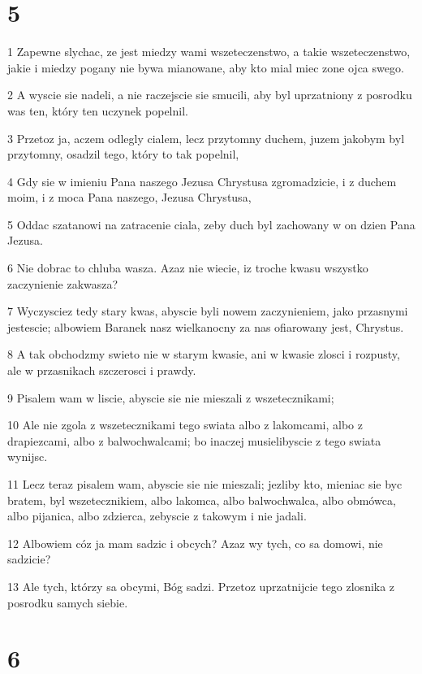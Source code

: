 \chapter{5}

\par 1 Zapewne slychac, ze jest miedzy wami wszeteczenstwo, a takie wszeteczenstwo, jakie i miedzy pogany nie bywa mianowane, aby kto mial miec zone ojca swego.
\par 2 A wyscie sie nadeli, a nie raczejscie sie smucili, aby byl uprzatniony z posrodku was ten, który ten uczynek popelnil.
\par 3 Przetoz ja, aczem odlegly cialem, lecz przytomny duchem, juzem jakobym byl przytomny, osadzil tego, który to tak popelnil,
\par 4 Gdy sie w imieniu Pana naszego Jezusa Chrystusa zgromadzicie, i z duchem moim, i z moca Pana naszego, Jezusa Chrystusa,
\par 5 Oddac szatanowi na zatracenie ciala, zeby duch byl zachowany w on dzien Pana Jezusa.
\par 6 Nie dobrac to chluba wasza. Azaz nie wiecie, iz troche kwasu wszystko zaczynienie zakwasza?
\par 7 Wyczysciez tedy stary kwas, abyscie byli nowem zaczynieniem, jako przasnymi jestescie; albowiem Baranek nasz wielkanocny za nas ofiarowany jest, Chrystus.
\par 8 A tak obchodzmy swieto nie w starym kwasie, ani w kwasie zlosci i rozpusty, ale w przasnikach szczerosci i prawdy.
\par 9 Pisalem wam w liscie, abyscie sie nie mieszali z wszetecznikami;
\par 10 Ale nie zgola z wszetecznikami tego swiata albo z lakomcami, albo z drapiezcami, albo z balwochwalcami; bo inaczej musielibyscie z tego swiata wynijsc.
\par 11 Lecz teraz pisalem wam, abyscie sie nie mieszali; jezliby kto, mieniac sie byc bratem, byl wszetecznikiem, albo lakomca, albo balwochwalca, albo obmówca, albo pijanica, albo zdzierca, zebyscie z takowym i nie jadali.
\par 12 Albowiem cóz ja mam sadzic i obcych? Azaz wy tych, co sa domowi, nie sadzicie?
\par 13 Ale tych, którzy sa obcymi, Bóg sadzi. Przetoz uprzatnijcie tego zlosnika z posrodku samych siebie.

\chapter{6}

